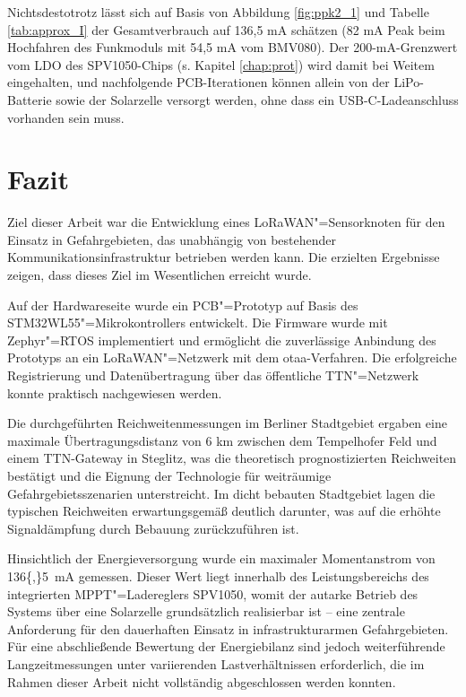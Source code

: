 Nichtsdestotrotz lässt sich auf Basis von Abbildung \ref{fig:ppk2_1} und Tabelle \ref{tab:approx_I} der Gesamtverbrauch
auf 136,5 mA schätzen (82 mA Peak beim Hochfahren des Funkmoduls mit 54,5 mA vom BMV080). Der 200-mA-Grenzwert vom LDO des 
SPV1050-Chips (s. Kapitel \ref{chap:prot}) wird damit bei Weitem eingehalten, und nachfolgende PCB-Iterationen können
allein von der LiPo-Batterie sowie der Solarzelle versorgt werden, ohne dass ein USB-C-Ladeanschluss vorhanden sein muss.

\section{Fazit}
\label{sec:fazit}

Ziel dieser Arbeit war die Entwicklung eines LoRaWAN"=Sensorknoten für den Einsatz in Gefahrgebieten, das
unabhängig von bestehender Kommunikationsinfrastruktur betrieben werden kann. Die erzielten Ergebnisse zeigen, dass dieses 
Ziel im Wesentlichen erreicht wurde.

Auf der Hardwareseite wurde ein PCB"=Prototyp auf Basis des STM32WL55"=Mikrokontrollers entwickelt. 
Die Firmware wurde mit Zephyr"=RTOS implementiert und ermöglicht die zuverlässige Anbindung des Prototyps an ein
LoRaWAN"=Netzwerk mit dem \acrshort{otaa}-Verfahren. Die erfolgreiche Registrierung und Datenübertragung über das öffentliche
TTN"=Netzwerk konnte praktisch nachgewiesen werden.

Die durchgeführten Reichweitenmessungen im Berliner Stadtgebiet ergaben eine maximale Übertragungsdistanz von 6 km zwischen
dem Tempelhofer Feld und einem TTN-Gateway in Steglitz, was die theoretisch prognostizierten Reichweiten 
bestätigt und die Eignung der Technologie für weiträumige Gefahrgebietsszenarien unterstreicht. Im dicht bebauten Stadtgebiet
lagen die typischen Reichweiten erwartungsgemäß deutlich darunter, was auf die erhöhte Signaldämpfung durch Bebauung zurückzuführen ist.

Hinsichtlich der Energieversorgung wurde ein maximaler Momentanstrom
von \SI{136{,}5}{\milli\ampere} gemessen. Dieser Wert liegt innerhalb
des Leistungsbereichs des integrierten MPPT"=Ladereglers SPV1050,
womit der autarke Betrieb des Systems über eine Solarzelle grundsätzlich
realisierbar ist -- eine zentrale Anforderung für den dauerhaften
Einsatz in infrastrukturarmen Gefahrgebieten. Für eine abschließende
Bewertung der Energiebilanz sind jedoch weiterführende Langzeitmessungen
unter variierenden Lastverhältnissen erforderlich, die im Rahmen dieser
Arbeit nicht vollständig abgeschlossen werden konnten.


